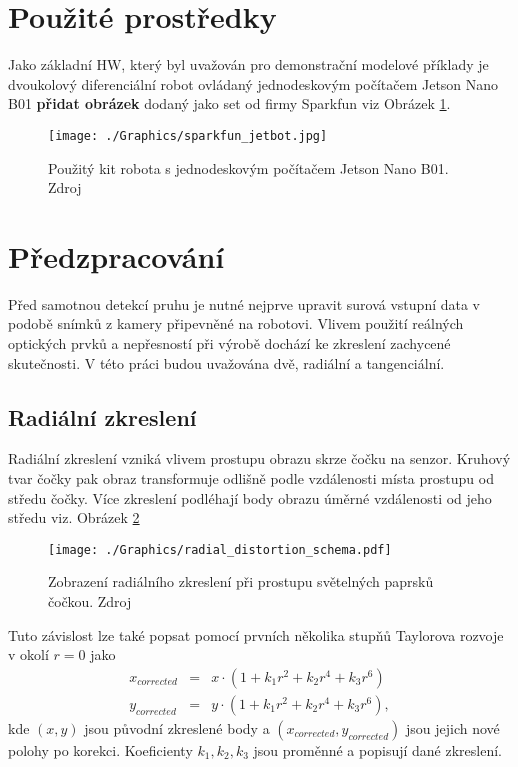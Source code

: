 \documentclass[czech, bc, kky, he, iso690numb]{fasthesis}
\begin{document}
        \section{Použité prostředky}
            Jako základní HW, který byl uvažován pro demonstrační modelové příklady je dvoukolový diferenciální robot ovládaný jednodeskovým počítačem Jetson Nano B01 \textbf{přidat obrázek} dodaný jako set od firmy Sparkfun viz Obrázek \ref{pic:sparkfun_jetbot}.
            	\begin{figure}[h]
            		\centering
            		\texttt{[image: ./Graphics/sparkfun\_jetbot.jpg]}
            		\caption{Použitý kit robota s jednodeskovým počítačem Jetson Nano B01. Zdroj \cite{sparkfun_jetbot} }
            		\label{pic:sparkfun_jetbot}
            	\end{figure}
        \section{Předzpracování}
        	Před samotnou detekcí pruhu je nutné nejprve upravit surová vstupní data v podobě snímků z kamery připevněné na robotovi. Vlivem použití reálných optických prvků a nepřesností při výrobě dochází ke zkreslení zachycené skutečnosti. V této práci budou uvažována dvě, radiální a tangenciální.
        	
        	\subsection{Radiální zkreslení}
        		Radiální zkreslení vzniká vlivem prostupu obrazu skrze čočku na senzor. Kruhový tvar čočky pak obraz transformuje odlišně podle vzdálenosti místa prostupu od středu čočky. Více zkreslení podléhají body obrazu úměrné vzdálenosti od jeho středu viz. Obrázek \ref{pic:radial_distortion}
        		
        			\begin{figure}[h]
        				\centering
        				\texttt{[image: ./Graphics/radial\_distortion\_schema.pdf]}
        				\caption{Zobrazení radiálního zkreslení při prostupu světelných paprsků čočkou. Zdroj \cite[p.~376]{learning_opencv} }
        				\label{pic:radial_distortion}
        			\end{figure}
        			
        		Tuto závislost lze také popsat pomocí prvních několika stupňů Taylorova rozvoje  v okolí \(r=0\) jako
        		\begin{eqnarray}
        			x_{corrected} &=& x\cdot(1 + k_{1}r^{2} + k_{2}r^{4} + k_{3}r^{6})\\
        			y_{corrected} &=& y\cdot(1 + k_{1}r^{2} + k_{2}r^{4} + k_{3}r^{6}),
        		\end{eqnarray}
        		kde \((x,y)\) jsou původní zkreslené body a \((x_{corrected}, y_{corrected})\) jsou jejich nové polohy po korekci. Koeficienty \(k_{1}, k_{2}, k_{3}\) jsou proměnné a popisují dané zkreslení.
\end{document}
